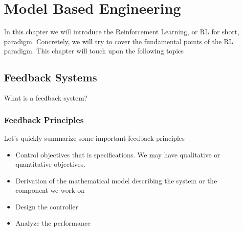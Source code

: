 \chapter{Model Based Engineering}
\label{model_based_eng}
In this chapter we will introduce the Reinforcement Learning, or RL for short, paradigm. Concretely, we will try to cover the fundamental points of the RL paradigm. This chapter will touch upon the following topics



\section{Feedback Systems}
What is a feedback system?


\subsection{Feedback Principles}
Let's quickly summarize some important feedback principles


\begin{itemize}

\item Control objectives that is specifications. We may have qualitative or quantitative objectives.
\item Derivation of the mathematical model describing the system or the component we work on
\item Design the controller
\item Analyze the performance
\end{itemize}







